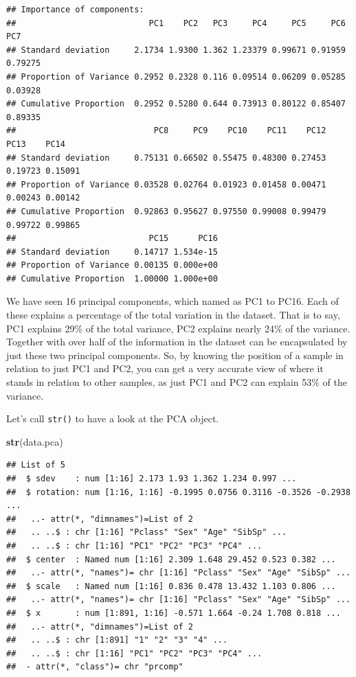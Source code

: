 \documentclass[
]{book}
\newenvironment{Shaded}{\begin{snugshade}}{\end{snugshade}}
\newcommand{\KeywordTok}[1]{\textcolor[rgb]{0.13,0.29,0.53}{\textbf{#1}}}
\newcommand{\NormalTok}[1]{#1}
\begin{document}
\begin{verbatim}
## Importance of components:
##                           PC1    PC2   PC3     PC4     PC5     PC6     PC7
## Standard deviation     2.1734 1.9300 1.362 1.23379 0.99671 0.91959 0.79275
## Proportion of Variance 0.2952 0.2328 0.116 0.09514 0.06209 0.05285 0.03928
## Cumulative Proportion  0.2952 0.5280 0.644 0.73913 0.80122 0.85407 0.89335
##                            PC8     PC9    PC10    PC11    PC12    PC13    PC14
## Standard deviation     0.75131 0.66502 0.55475 0.48300 0.27453 0.19723 0.15091
## Proportion of Variance 0.03528 0.02764 0.01923 0.01458 0.00471 0.00243 0.00142
## Cumulative Proportion  0.92863 0.95627 0.97550 0.99008 0.99479 0.99722 0.99865
##                           PC15      PC16
## Standard deviation     0.14717 1.534e-15
## Proportion of Variance 0.00135 0.000e+00
## Cumulative Proportion  1.00000 1.000e+00
\end{verbatim}

We have seen 16 principal components, which named as PC1 to PC16. Each of these explains a percentage of the total variation in the dataset. That is to say, PC1 explains 29\% of the total variance, PC2 explains nearly 24\% of the variance. Together with over half of the information in the dataset can be encapsulated by just these two principal components. So, by knowing the position of a sample in relation to just PC1 and PC2, you can get a very accurate view of where it stands in relation to other samples, as just PC1 and PC2 can explain 53\% of the variance.

Let's call \texttt{str()} to have a look at the PCA object.

\begin{Shaded}
\begin{Highlighting}[]
\KeywordTok{str}\NormalTok{(data.pca)}
\end{Highlighting}
\end{Shaded}

\begin{verbatim}
## List of 5
##  $ sdev    : num [1:16] 2.173 1.93 1.362 1.234 0.997 ...
##  $ rotation: num [1:16, 1:16] -0.1995 0.0756 0.3116 -0.3526 -0.2938 ...
##   ..- attr(*, "dimnames")=List of 2
##   .. ..$ : chr [1:16] "Pclass" "Sex" "Age" "SibSp" ...
##   .. ..$ : chr [1:16] "PC1" "PC2" "PC3" "PC4" ...
##  $ center  : Named num [1:16] 2.309 1.648 29.452 0.523 0.382 ...
##   ..- attr(*, "names")= chr [1:16] "Pclass" "Sex" "Age" "SibSp" ...
##  $ scale   : Named num [1:16] 0.836 0.478 13.432 1.103 0.806 ...
##   ..- attr(*, "names")= chr [1:16] "Pclass" "Sex" "Age" "SibSp" ...
##  $ x       : num [1:891, 1:16] -0.571 1.664 -0.24 1.708 0.818 ...
##   ..- attr(*, "dimnames")=List of 2
##   .. ..$ : chr [1:891] "1" "2" "3" "4" ...
##   .. ..$ : chr [1:16] "PC1" "PC2" "PC3" "PC4" ...
##  - attr(*, "class")= chr "prcomp"
\end{verbatim}
\end{document}
